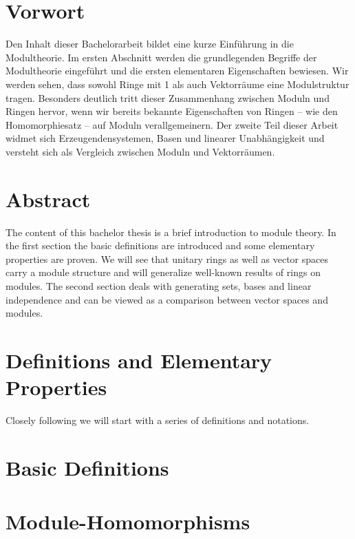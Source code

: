 \newpage

\thispagestyle{empty}

\renewcommand{\thepage}{}

\section*{Vorwort}
Den Inhalt dieser Bachelorarbeit bildet eine kurze Einf\"uhrung in die Modultheorie. Im ersten Abschnitt werden die grundlegenden Begriffe der Modultheorie eingef\"uhrt und die ersten elementaren Eigenschaften bewiesen. Wir werden sehen, dass sowohl Ringe mit 1 als auch Vektorr\"aume eine Modulstruktur tragen. Besonders deutlich tritt dieser Zusammenhang zwischen Moduln und Ringen hervor, wenn wir bereits bekannte Eigenschaften von Ringen -- wie den Homomorphiesatz -- auf Moduln verallgemeinern. Der zweite Teil dieser Arbeit widmet sich Erzeugendensystemen, Basen und linearer Unabh\"angigkeit und versteht sich als Vergleich zwischen Moduln und Vektorr\"aumen. 
\vspace{1.5cm}
\section*{Abstract}
The content of this bachelor thesis is a brief introduction to module theory. In the first section the basic definitions are introduced and some elementary properties are proven. We will see that unitary rings as well as vector spaces carry a module structure and will generalize well-known results of rings on modules. The second section deals with generating sets, bases and linear independence and can be viewed as a comparison between vector spaces and modules.

\newpage

\section{Definitions and Elementary Properties}

	Closely following \cite[Chap.VII]{jantzen2005algebra} we will start with a series of definitions and notations.
	
	\section{Basic Definitions}
	
		

	\section{Module-Homomorphisms}
		
